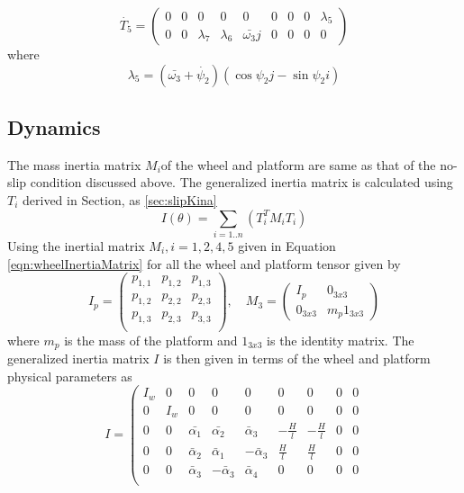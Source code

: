 {\begin{equation}
\label{eqn:slip_dT5}
\dot{T_5}=
\begin{pmatrix}
0 & 0 & 0 & 0 & 0 & 0 & 0 & 0 & \lambda_5\\
0 & 0 & \lambda_7 & \lambda_6 & \bar{\omega_3}j & 0 & 0 & 0 & 0
\end{pmatrix}
\end{equation}
where 
\[ \lambda_5 = (\bar{\omega_3}+\dot{\psi_2}) (\cos\psi_2 j-\sin \psi_2 i) \]
\subsection{Dynamics }
\label{sec:slipDynamics}
The mass inertia matrix $M_i$of the wheel and platform are same as that of the no-slip condition discussed above. The generalized inertia matrix is calculated using $T_i$ derived in Section, as \ref{sec:slipKina}
\begin{equation}
I(\theta)=\sum_{i=1..n}(T_i^TM_iT_i)
\end{equation}
Using the inertial matrix $M_i, i=1,2,4,5$ given in Equation \ref{eqn:wheelInertiaMatrix} for all the wheel and platform tensor given by \[ I_p=\begin{pmatrix}
 p_{1,1} & p_{1,2} & p_{1,3}\\   
 p_{1,2} & p_{2,2} & p_{2,3}\\   
 p_{1,3} & p_{2,3} & p_{3,3}\\   
\end{pmatrix},  \quad  M_3=\begin{pmatrix}
 I_p & 0_{3x3}\\
 0_{3x3} & m_p 1_{3x3}
\end{pmatrix}\]
where $m_p$ is the mass of the platform and $1_{3x3}$ is the identity matrix.
The generalized inertia matrix $I$ is then given in terms of the wheel and platform physical parameters as 
\begin{equation}
    I=
    \left(
\begin{array}{ccccccccc}
I_w & 0 & 0 & 0 & 0 & 0 & 0 & 0 & 0 \\
 0 & I_w & 0 & 0 & 0 & 0 & 0 & 0 & 0 \\
 0 & 0 & \bar{\alpha_1} & \bar{\alpha_2} & \bar \alpha_3  & -\frac{H}{l} & -\frac{H}{l} & 0 & 0 \\
 0 & 0 & \bar \alpha_2 & \bar \alpha_1 & -\bar\alpha_3 & \frac{H}{l} & \frac{H}{l} & 0 & 0 \\
 0 & 0 & \bar\alpha_3 & -\bar\alpha_3 & \bar\alpha_4& 0 & 0 & 0 & 0 \\

\end{array}
\end{equation}}
